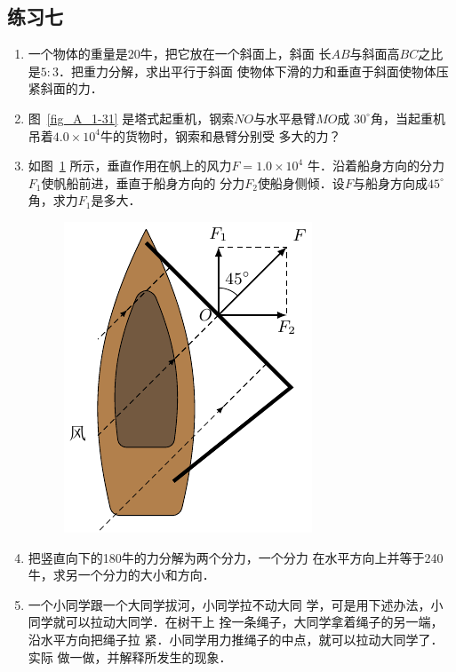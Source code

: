 \subsection*{练习七} 
\begin{enumerate} 

\item 一个物体的重量是20牛，把它放在一个斜面上，斜面
长$AB$与斜面高$BC$之比是$5:3$．把重力分解，求出平行于斜面
使物体下滑的力和垂直于斜面使物体压紧斜面的力．
 


\item 图~\ref{fig_A_1-31} 是塔式起重机，钢索$NO$与水平悬臂$MO$成
$30^\circ$角，当起重机吊着$4.0\times 10^4$牛的货物时，钢索和悬臂分别受
多大的力？
\item 如图~\ref{fig_A_1-32} 所示，垂直作用在帆上的风力$F=1.0\times 10^4$
牛．沿着船身方向的分力$F_1$使帆船前进，垂直于船身方向的
分力$F_2$使船身侧倾．设$F$与船身方向成$45^\circ$角，求力$F_1$是多大．
\begin{figure} [htp]
\centering\includegraphics{fig/A/1-32.pdf} 
\caption{} \label{fig_A_1-32} 
\end{figure} 

\item 把竖直向下的180牛的力分解为两个分力，一个分力
在水平方向上并等于240牛，求另一个分力的大小和方向．

\item 一个小同学跟一个大同学拔河，小同学拉不动大同
学，可是用下述办法，小同学就可以拉动大同学．在树干上
拴一条绳子，大同学拿着绳子的另一端，沿水平方向把绳子拉
紧．小同学用力推绳子的中点，就可以拉动大同学了．实际
做一做，并解释所发生的现象．

\end{enumerate} 

